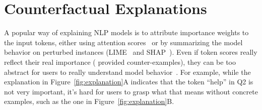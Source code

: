 
\newcommand{\fwone}[1]{\colbox{cfwone}{#1}\xspace}
\newcommand{\fwtwo}[1]{\colbox{cfwtwo}{#1}\xspace}
\newcommand{\fwthree}[1]{\colbox{cfwthree}{#1}\xspace}
\newcommand{\fwfour}[1]{\colbox{cfwfour}{#1}\xspace}

\newcommand{\fexp}[2]{\texttt{[{\color{darkgray}{#1:#2}}]}\xspace}
\newcommand{\fexptag}[1]{\fexp{TAG}{#1}}
\newcommand{\fexpfrom}[1]{\fexp{FROM}{#1}}
\newcommand{\fexpto}[1]{\fexp{TO}{#1}}
\newcommand{\fexptemp}[1]{\fexp{TEMP}{#1}}


\section{Counterfactual Explanations}
\label{sec:app_explain}





A popular way of explaining NLP models is to attribute importance weights to the input tokens, either using attention scores~\cite{wiegreffe2019attention} or by summarizing the model behavior on perturbed instances (\eg LIME~\cite{Ribeiro2016WhySI} and SHAP~\cite{NIPS2017_7062}).
Even if token scores really reflect their real importance (\citet{pruthi2020learning} provided counter-examples), they can be too abstract for users to really understand model behavior~\cite{miller}. For example, while the explanation in Figure~\ref{fig:explanation}A indicates that the token ``help'' in Q2 is not very important, it's hard for users to grasp what that means without concrete examples, such as the one in Figure~\ref{fig:explanation}B. 

